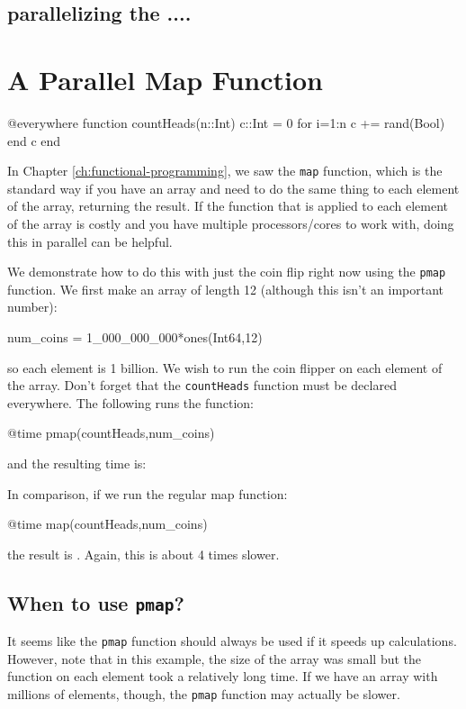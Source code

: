 \subsection{parallelizing the ....}



\section{A Parallel Map Function}

\begin{jlcode}[parallel]
@everywhere function countHeads(n::Int)
   c::Int = 0
   for i=1:n
       c += rand(Bool)
   end
   c
end
\end{jlcode}

In Chapter \ref{ch:functional-programming}, we saw the \texttt{map} function, which is the standard way if you have an array and need to do the same thing to each element of the array, returning the result. If the function that is applied to each element of the array is costly and you have multiple processors/cores to work with, doing this in parallel can be helpful.

We demonstrate how to do this with just the coin flip right now using the \texttt{pmap} function.  We first make an array of length 12 (although this isn't an important number): 
%
\begin{jlblock}[parallel]
num_coins = 1_000_000_000*ones(Int64,12)
\end{jlblock}
%
so each element is 1 billion. We wish to run the coin flipper on each element of the array. Don't forget that the \texttt{countHeads} function must be declared everywhere. The following runs the function:
%
\begin{jlblock}[parallel]
@time pmap(countHeads,num_coins)
\end{jlblock}
%
and the resulting time is: \printpythontex[verbatim]

In comparison, if we run the regular map function:
%
\begin{jlblock}[parallel]
@time map(countHeads,num_coins)
\end{jlblock}
%
the result is \printpythontex[verb]. Again, this is about 4 times slower.


\subsection{When to use \texttt{pmap}?}

It seems like the \verb!pmap! function should always be used if it speeds up calculations.  However, note that in this example, the size of the array was small but the function on each element took a relatively long time.  If we have an array with millions of elements, though, the \texttt{pmap} function may actually be slower.  


